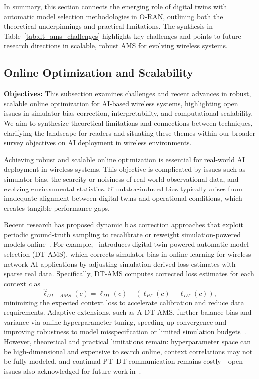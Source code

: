 \documentclass[sigconf]{acmart}
\begin{document}
In summary, this section connects the emerging role of digital twins with automatic model selection methodologies in O-RAN, outlining both the theoretical underpinnings and practical limitations. The synthesis in Table~\ref{tab:dt_ams_challenges} highlights key challenges and points to future research directions in scalable, robust AMS for evolving wireless systems.

\subsection{Online Optimization and Scalability}

\textbf{Objectives:} This subsection examines challenges and recent advances in robust, scalable online optimization for AI-based wireless systems, highlighting open issues in simulator bias correction, interpretability, and computational scalability. We aim to synthesize theoretical limitations and connections between techniques, clarifying the landscape for readers and situating these themes within our broader survey objectives on AI deployment in wireless environments.

Achieving robust and scalable online optimization is essential for real-world AI deployment in wireless systems. This objective is complicated by issues such as simulator bias, the scarcity or noisiness of real-world observational data, and evolving environmental statistics. Simulator-induced bias typically arises from inadequate alignment between digital twins and operational conditions, which creates tangible performance gaps.

Recent research has proposed dynamic bias correction approaches that exploit periodic ground-truth sampling to recalibrate or reweight simulation-powered models online~\cite{ref37,ref38}. For example,~\cite{ref37} introduces digital twin-powered automatic model selection (DT-AMS), which corrects simulator bias in online learning for wireless network AI applications by adjusting simulation-derived loss estimates with sparse real data. Specifically, DT-AMS computes corrected loss estimates for each context $c$ as
\[
\hat{\ell}_{DT-AMS}(c) = \ell_{DT}(c) + (\ell_{PT}(c) - \ell_{DT}(c)),
\]
minimizing the expected context loss to accelerate calibration and reduce data requirements. Adaptive extensions, such as A-DT-AMS, further balance bias and variance via online hyperparameter tuning, speeding up convergence and improving robustness to model misspecification or limited simulation budgets~\cite{ref37}. However, theoretical and practical limitations remain: hyperparameter space can be high-dimensional and expensive to search online, context correlations may not be fully modeled, and continual PT–DT communication remains costly—open issues also acknowledged for future work in~\cite{ref37}.
\end{document}
